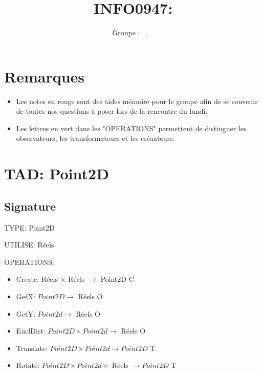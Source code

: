 \documentclass[a4paper, 11pt, oneside]{article}
\title{INFO0947: \intitule}
\author{Groupe \GrNbr : \PrenomUN~\textsc{\NomUN}, \PrenomDEUX~\textsc{\NomDEUX}}
\date{}
\newcommand{\tablemat}{~}
\renewcommand{\tablemat}{\tableofcontents}
\begin{document}
\maketitle
\newpage
\tablemat
\newpage

\section{Remarques}
\begin{itemize}
    \item Les notes en {\color{red}rouge} sont des aides mémoire pour le groupe afin de se souvenir de toutes nos questions à poser lors de la rencontre du lundi.
    \item Les lettres en {\color{green}vert} dans les "OPERATIONS" permettent de distinguer les observateurs, les transformateurs et les créaateurs.
\end{itemize}


\section{TAD: Point2D}

\subsection{Signature}

\noindent TYPE: Point2D

\noindent UTILISE: Réels 

\noindent OPERATIONS: 
\begin{itemize}
    \item Create: Réels $\times$ Réels $\xrightarrow{}$ Point2D {\color{green} C}
    \item GetX: $Point2D \xrightarrow{}$ Réels {\color{green} O}
    \item GetY: $Point2d \xrightarrow{}$ Réels {\color{green} O}
    \item EuclDist: $Point2D \times Point2d \xrightarrow{}$ Réels {\color{green} O}
    \item Translate: $Point2D \times Point2d \xrightarrow{} Point2D$ {\color{green} T}
    \item Rotate: $Point2D \times Point2d  \times $ Réels $\xrightarrow{} Point2D $ {\color{green} T}
\end{itemize}
\end{document}

